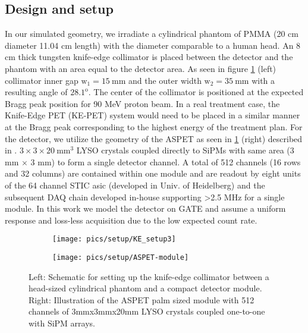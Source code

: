 \documentclass[11pt,a4paper]{article}
\begin{document}
\subsection{Design and setup}
In our simulated geometry, we irradiate a cylindrical phantom of PMMA (20 cm diameter 11.04 cm length) with the diameter comparable to a human head. An 8 cm thick tungsten knife-edge collimator is placed between the detector and the phantom with an area equal to the detector area. As seen in figure \ref{fig_KE_setup} (left) collimator inner  gap $\mathrm{w_1=15\ mm}$ and the outer width $\mathrm{w_2=35\ mm}$ with a resulting angle of $\mathrm{28.1^o}$.  The center of the  collimator is positioned at the expected Bragg peak position for 90 MeV proton beam. In a real treatment case, the Knife-Edge PET (KE-PET) system would need to be placed in a similar manner at the Bragg peak corresponding to the highest energy of the treatment plan. For the detector, we utilize the geometry of the ASPET as seen in \ref{fig_KE_setup} (right) described in \cite{Nemallapudi2021}. $\mathrm{3\times 3\times 20\ mm^3}$ LYSO crystals coupled directly to SiPMs with same area (3 mm $\times$ 3 mm) to form a single detector channel. A total of 512 channels (16 rows and 32 columns) are contained within one module and are readout by eight units of the 64 channel STIC asic \cite{stic} (developed in Univ. of Heidelberg) and the subsequent DAQ chain developed in-house supporting >2.5 MHz for a single module. In this work we model the detector on GATE and assume a uniform response and loss-less acquisition due to the low expected count rate.

\begin{figure}[h] 
\begin{subfigure}[b]{0.49\linewidth}
\centering
\texttt{[image: pics/setup/KE\_setup3]}
\end{subfigure}
\hspace{0.02\linewidth}
\begin{subfigure}[b]{0.49\linewidth}
{\centering\texttt{[image: pics/setup/ASPET-module]}}
\end{subfigure}
\caption{Left: Schematic for setting up the knife-edge collimator  between a head-sized cylindrical phantom and a compact detector module. Right: Illustration of the ASPET palm sized module with 512 channels of 3mmx3mmx20mm LYSO crystals coupled one-to-one with SiPM arrays. }
\label{fig_KE_setup}
\end{figure}
\end{document}
